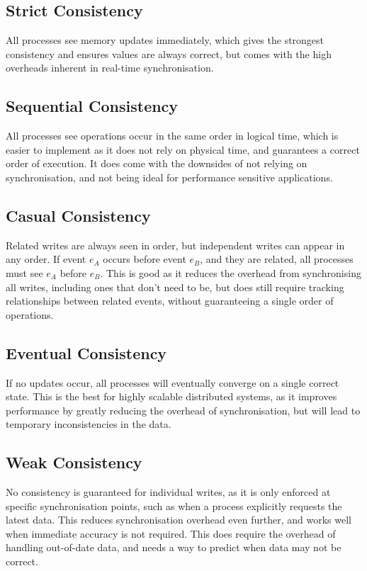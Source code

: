 \subsection*{Strict Consistency}

All processes see memory updates immediately, which gives the strongest consistency and ensures values are always correct, but comes with the high overheads inherent in real-time synchronisation.

\subsection*{Sequential Consistency}

All processes see operations occur in the same order in logical time, which is easier to implement as it does not rely on physical time, and guarantees a correct order of execution. It does come with the downsides of not relying on synchronisation, and not being ideal for performance sensitive applications.

\subsection*{Casual Consistency}

Related writes are always seen in order, but independent writes can appear in any order. If event $e_A$ occurs before event $e_B$, and they are related, all processes must see $e_A$ before $e_B$. This is good as it reduces the overhead from synchronising all writes, including ones that don't need to be, but does still require tracking relationships between related events, without guaranteeing a single order of operations.

\subsection*{Eventual Consistency}

If no updates occur, all processes will eventually converge on a single correct state. This is the best for highly scalable distributed systems, as it improves performance by greatly reducing the overhead of synchronisation, but will lead to temporary inconsistencies in the data.

\subsection*{Weak Consistency}

No consistency is guaranteed for individual writes, as it is only enforced at specific synchronisation points, such as when a process explicitly requests the latest data. This reduces synchronisation overhead even further, and works well when immediate accuracy is not required. This does require the overhead of handling out-of-date data, and needs a way to predict when data may not be correct.

